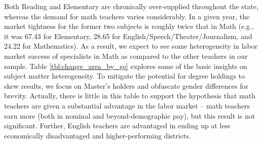 Both Reading and Elementary are chronically over-supplied throughout the
state, whereas the demand for math teachers varies considerably. In a
given year, the market tightness for the former two subjects is roughly
twice that in Math (e.g., it was 67.43 for Elementary, 28.65 for
English/Speech/Theater/Journalism, and 24.22 for Mathematics). As a
result, we expect to see some heterogeneity in labor market success of
specialists in Math as compared to the other teachers in our sample.
Table \ref{tbl:change_area_by_ge} explores some of the basic insights on
subject matter heterogeneity. To mitigate the potential for degree
holdings to skew results, we focus on Master's holders and obfuscate
gender differences for brevity. Actually, there is little in this table
to support the hypothesis that math teachers are given a substantial
advantage in the labor market -- math teachers earn more (both in
nominal and beyond-demographic pay), but this result is not significant.
Further, English teachers are advantaged in ending up at less
economically disadvantaged and higher-performing districts.

